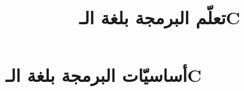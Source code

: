\documentclass[11pt, a4paper]{book}
\title{تعلّم البرمجة بلغة الـC}
\let\oldpart\part
\renewcommand\part[1]{{\color{orange}\oldpart{#1}}}
\begin{document}
  \part{أساسيّات البرمجة بلغة الـC}
  
\end{document}
